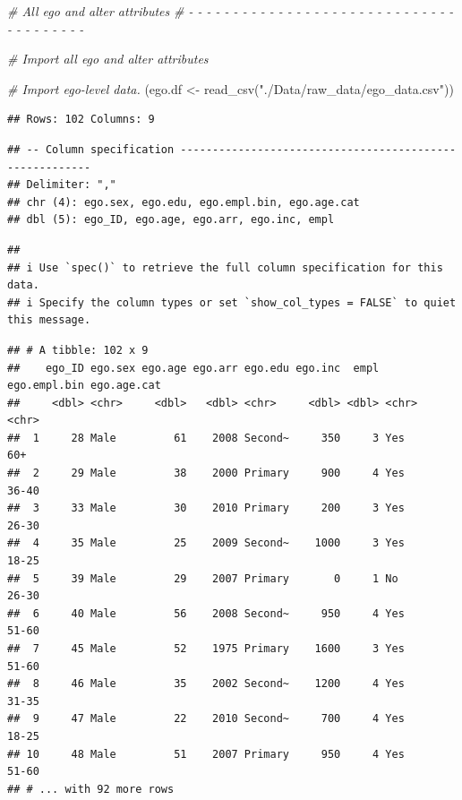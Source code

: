 \documentclass[
]{book}
\newenvironment{Shaded}{\begin{snugshade}}{\end{snugshade}}
\newcommand{\CommentTok}[1]{\textcolor[rgb]{0.56,0.35,0.01}{\textit{#1}}}
\newcommand{\FunctionTok}[1]{\textcolor[rgb]{0.00,0.00,0.00}{#1}}
\newcommand{\NormalTok}[1]{#1}
\newcommand{\OtherTok}[1]{\textcolor[rgb]{0.56,0.35,0.01}{#1}}
\newcommand{\StringTok}[1]{\textcolor[rgb]{0.31,0.60,0.02}{#1}}
\begin{document}
\begin{Shaded}
\begin{Highlighting}[]
\CommentTok{\# All ego and alter attributes}
\CommentTok{\# {-} {-} {-} {-} {-} {-} {-} {-} {-} {-} {-} {-} {-} {-} {-} {-} {-} {-} {-} {-} {-} {-} {-} {-} {-} {-} {-} {-} {-} {-} {-} {-} {-} {-} {-} {-} {-} {-} {-} }

\CommentTok{\# Import all ego and alter attributes}

\CommentTok{\# Import ego{-}level data.}
\NormalTok{(ego.df }\OtherTok{\textless{}{-}} \FunctionTok{read\_csv}\NormalTok{(}\StringTok{"./Data/raw\_data/ego\_data.csv"}\NormalTok{))}
\end{Highlighting}
\end{Shaded}

\begin{verbatim}
## Rows: 102 Columns: 9
\end{verbatim}

\begin{verbatim}
## -- Column specification --------------------------------------------------------
## Delimiter: ","
## chr (4): ego.sex, ego.edu, ego.empl.bin, ego.age.cat
## dbl (5): ego_ID, ego.age, ego.arr, ego.inc, empl
\end{verbatim}

\begin{verbatim}
## 
## i Use `spec()` to retrieve the full column specification for this data.
## i Specify the column types or set `show_col_types = FALSE` to quiet this message.
\end{verbatim}

\begin{verbatim}
## # A tibble: 102 x 9
##    ego_ID ego.sex ego.age ego.arr ego.edu ego.inc  empl ego.empl.bin ego.age.cat
##     <dbl> <chr>     <dbl>   <dbl> <chr>     <dbl> <dbl> <chr>        <chr>      
##  1     28 Male         61    2008 Second~     350     3 Yes          60+        
##  2     29 Male         38    2000 Primary     900     4 Yes          36-40      
##  3     33 Male         30    2010 Primary     200     3 Yes          26-30      
##  4     35 Male         25    2009 Second~    1000     3 Yes          18-25      
##  5     39 Male         29    2007 Primary       0     1 No           26-30      
##  6     40 Male         56    2008 Second~     950     4 Yes          51-60      
##  7     45 Male         52    1975 Primary    1600     3 Yes          51-60      
##  8     46 Male         35    2002 Second~    1200     4 Yes          31-35      
##  9     47 Male         22    2010 Second~     700     4 Yes          18-25      
## 10     48 Male         51    2007 Primary     950     4 Yes          51-60      
## # ... with 92 more rows
\end{verbatim}
\end{document}

